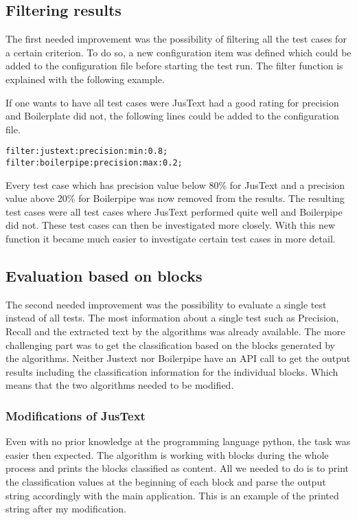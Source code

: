 \subsection{Filtering results}
The first needed improvement was the possibility of filtering all the test cases for a certain criterion. To do so, a new configuration item was defined which could be added to the configuration file before starting the test run. The filter function is explained with the following example.

If one wants to have all test cases were JusText had a good rating for precision and Boilerplate did not, the following lines could be added to the configuration file.

\begin{lstlisting}
filter:justext:precision:min:0.8;
filter:boilerpipe:precision:max:0.2;
\end{lstlisting} 

Every test case which has precision value below 80\% for JusText and a precision value above 20\% for Boilerpipe was now removed from the results. The resulting test cases were all test cases where JusText performed quite well and Boilerpipe did not. These test cases can then be investigated more closely.
With this new function it became much easier to investigate certain test cases in more detail.

\subsection{Evaluation based on blocks}

The second needed improvement was the possibility to evaluate a single test instead of all tests.
The most information about a single test such as Precision, Recall and the extracted text by the algorithms was already available. The more challenging part was to get the classification based on the blocks generated by the algorithms. Neither Justext nor Boilerpipe have an API call to get the output results including the classification information for the individual blocks. Which means that the two algorithms needed to be modified.

\subsubsection{Modifications of JusText}
\label{subsec:Modification JusText}

Even with no prior knowledge at the programming language python, the task was easier then expected. The algorithm is working with blocks during the whole process and prints the blocks classified as content. All we needed to do is to print the classification values at the beginning of each block and parse the output string accordingly with the main application.
This is an example of the printed string after my modification. \linebreak

